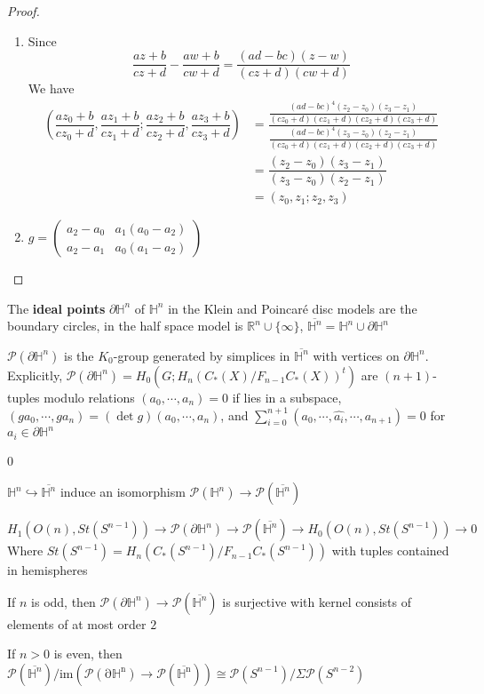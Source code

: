 \documentclass[../main.tex]{subfiles}
\def\CROP{1}
\begin{document}
\begin{proof} \hfill
\begin{enumerate}[label=\textbf{\arabic*.}, leftmargin=*]
\item Since
\[\frac{az+b}{cz+d}-\frac{aw+b}{cw+d}=\frac{(ad-bc)(z-w)}{(cz+d)(cw+d)}\]
We have
\begin{align*}
\left(\dfrac{az_0+b}{cz_0+d},\dfrac{az_1+b}{cz_1+d};\dfrac{az_2+b}{cz_2+d},\dfrac{az_3+b}{cz_3+d}\right)&=
\frac{\dfrac{(ad-bc)^4(z_2-z_0)(z_3-z_1)}{(cz_0+d)(cz_1+d)(cz_2+d)(cz_3+d)}}{\dfrac{(ad-bc)^4(z_3-z_0)(z_2-z_1)}{(cz_0+d)(cz_1+d)(cz_2+d)(cz_3+d)}} \\
&=\dfrac{(z_2-z_0)(z_3-z_1)}{(z_3-z_0)(z_2-z_1)} \\
&=(z_0,z_1;z_2,z_3)
\end{align*}
\item $g=\begin{pmatrix}
a_2-a_0 & a_1(a_0-a_2) \\
a_2-a_1 & a_0(a_1-a_2)
\end{pmatrix}$
\end{enumerate}
\end{proof}

\begin{definition}
The \textbf{ideal points} $\partial\mathbb H^n$ of $\mathbb H^n$ in the Klein and Poincar\'e disc models are the boundary circles, in the half space model is $\mathbb R^n\cup\{\infty\}$, $\overline{\mathbb H^n}=\mathbb H^n\cup\partial\mathbb H^n$ \par
$\mathcal P(\partial\mathbb H^n)$ is the $K_0$-group generated by simplices in $\overline{\mathbb H^n}$ with vertices on $\partial\mathbb H^n$. Explicitly, $\mathcal P(\partial\mathbb H^n)=H_0(G;H_n(C_*(X)/F_{n-1}C_*(X))^t)$ are $(n+1)$-tuples modulo relations $(a_0,\cdots,a_n)=0$ if lies in a subspace, $(ga_0,\cdots,ga_n)=(\det g)(a_0,\cdots,a_n)$, and $\displaystyle\sum_{i=0}^{n+1}(a_0,\cdots,\widehat{a_i},\cdots,a_{n+1})=0$ for $a_i\in\partial\mathbb H^n$
\end{definition}

\if\CROP0
\begin{theorem}
$\mathbb H^n\hookrightarrow\overline{\mathbb H^n}$ induce an isomorphism $\mathcal P(\mathbb H^n)\to\mathcal P(\overline{\mathbb H^n})$ \par
\[H_1(O(n),St(S^{n-1}))\to\mathcal P(\partial\mathbb H^n)\to\mathcal P(\overline{\mathbb H^n})\to H_0(O(n),St(S^{n-1}))\to0\]
Where $St(S^{n-1})=H_n(C_*(S^{n-1})/F_{n-1}C_*(S^{n-1}))$ with tuples contained in hemispheres \par
If $n$ is odd, then $\mathcal P(\partial\mathbb H^n)\to\mathcal P(\overline{\mathbb H^n})$ is surjective with kernel consists of elements of at most order $2$ \par
If $n>0$ is even, then $\mathcal P(\overline{\mathbb H^n})/\mathrm{im(\mathcal P(\partial\mathbb H^n)\to\mathcal P(\overline{\mathbb H^n}))}\cong\mathcal P(S^{n-1})/\Sigma\mathcal P(S^{n-2})$
\end{theorem}
\end{document}
